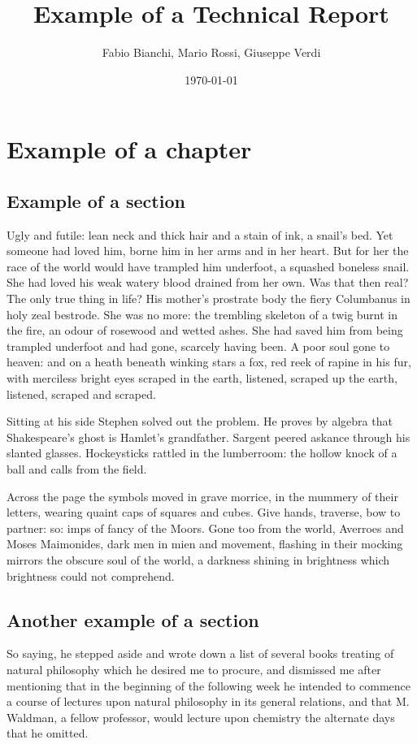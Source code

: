 \documentclass[12pt]{orbotech}
\title{Example of a Technical Report}
\author{Fabio Bianchi, Mario Rossi, Giuseppe Verdi}
\date{\today}
\begin{document}
\chapter{Example of a chapter}\label{ch:example}
  
\section{Example of a section}\label{sec:first_example}
  
Ugly and futile: lean neck and thick hair and a stain of ink, a snail's
bed. Yet someone had loved him, borne him in her arms and in her heart.
But for her the race of the world would have trampled him underfoot,
a squashed boneless snail. She had loved his weak watery blood drained
from her own. Was that then real? The only true thing in life? His
mother's prostrate body the fiery Columbanus in holy zeal bestrode.
She was no more: the trembling skeleton of a twig burnt in the fire,
an odour of rosewood and wetted ashes. She had saved him from being
trampled underfoot and had gone, scarcely having been. A poor soul
gone to heaven: and on a heath beneath winking stars a fox, red reek
of rapine in his fur, with merciless bright eyes scraped in the earth,
listened, scraped up the earth, listened, scraped and scraped.

Sitting at his side Stephen solved out the problem. He proves by algebra
that Shakespeare's ghost is Hamlet's grandfather. Sargent peered askance
through his slanted glasses. Hockeysticks rattled in the lumberroom: the
hollow knock of a ball and calls from the field.

Across the page the symbols moved in grave morrice, in the mummery of
their letters, wearing quaint caps of squares and cubes. Give hands,
traverse, bow to partner: so: imps of fancy of the Moors. Gone too from
the world, Averroes and Moses Maimonides, dark men in mien and movement,
flashing in their mocking mirrors the obscure soul of the world, a
darkness shining in brightness which brightness could not comprehend.
  
\section{Another example of a section}\label{sec:second_example}

So saying, he stepped aside and wrote down a list of several books
treating of natural philosophy which he desired me to procure, and
dismissed me after mentioning that in the beginning of the following
week he intended to commence a course of lectures upon natural
philosophy in its general relations, and that M. Waldman, a fellow
professor, would lecture upon chemistry the alternate days that he
omitted.
\end{document}

